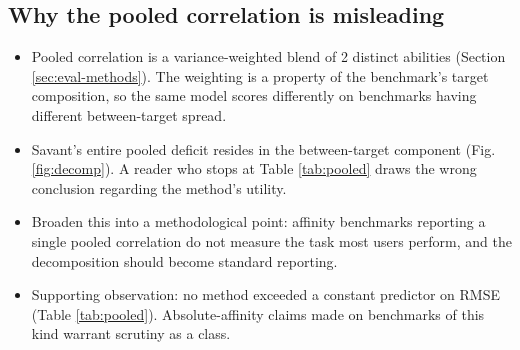 \documentclass[11pt]{article}
\begin{document}
\subsection*{Why the pooled correlation is misleading}
\begin{itemize}
  \item Pooled correlation is a variance-weighted blend of 2 distinct
        abilities (Section \ref{sec:eval-methods}). The weighting is a property
        of the benchmark's target composition, so the same model scores
        differently on benchmarks having different between-target spread.
  \item Savant's entire pooled deficit resides in the between-target component
        (Fig. \ref{fig:decomp}). A reader who stops at Table \ref{tab:pooled}
        draws the wrong conclusion regarding the method's utility.
  \item Broaden this into a methodological point: affinity benchmarks reporting
        a single pooled correlation do not measure the task most users perform,
        and the decomposition should become standard reporting.
  \item Supporting observation: no method exceeded a constant predictor on
        RMSE (Table \ref{tab:pooled}). Absolute-affinity claims made on
        benchmarks of this kind warrant scrutiny as a class.
\end{itemize}
\end{document}
